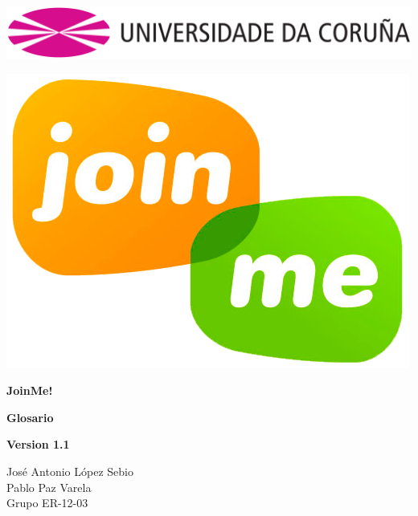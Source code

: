 \documentclass[12pt, a4paper, titlepage]{article}
\begin{document}

\begin{titlepage}

\includegraphics[width=15cm]{Imagenes/Simbolo_logo_UDC.png}

\vspace{3cm}

\begin{center}
\includegraphics[scale=0.3]{Imagenes/1a_Practica_ER_14-15.png}
\end{center}


\begin{flushright}
	
	\LARGE{\textbf{ JoinMe!}}
	
	\LARGE{\textbf{Glosario}}
	
	\large{\textbf{Version 1.1}}
\end{flushright}
\vspace{1cm}
\begin{center}
José Antonio López Sebio\\
Pablo Paz Varela\\
Grupo ER-12-03\\
\end{center}



\end{titlepage}
\end{document}
